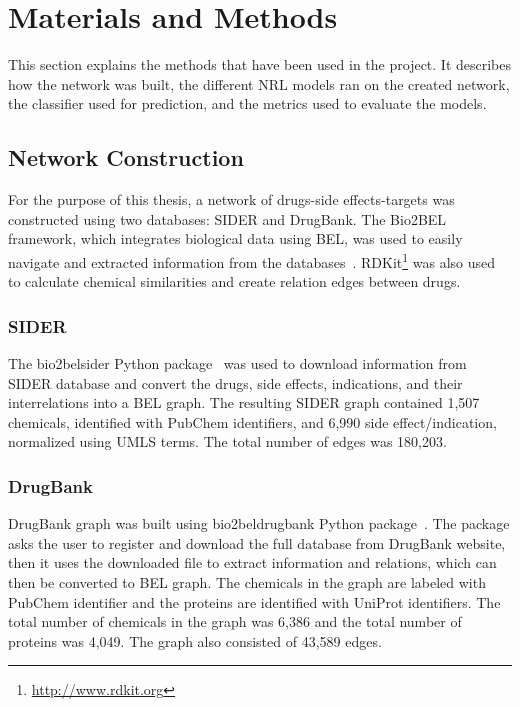 \chapter{Materials and Methods}
\label{methods}

This section explains the methods that have been used in the project.
It describes how the network was built, the different \ac{NRL} models ran on the created network, the classifier used for prediction, and the metrics used to evaluate the models.

\section{Network Construction}

For the purpose of this thesis, a network of drugs-side effects-targets was constructed using two databases: \ac{SIDER} and DrugBank.
The Bio2BEL framework, which integrates biological data using \ac{BEL}, was used to easily navigate and extracted information from the databases~\cite{hoyt_integration_2019}.
RDKit\footnote{\url{http://www.rdkit.org}} was also used to calculate chemical similarities and create relation edges between drugs.

\subsection{SIDER}
The bio2bel\textunderscore sider Python package~\cite{charles_tapley_hoyt_bio2bel/sider_2018} was used to download information from \ac{SIDER} database and convert the drugs, side effects, indications, and their interrelations into a \ac{BEL} graph.
The resulting \ac{SIDER} graph contained 1,507 chemicals, identified with PubChem identifiers, and 6,990 side effect/indication, normalized using \ac{UMLS} terms.
The total number of edges was 180,203.

\subsection{DrugBank}

DrugBank graph was built using bio2bel\textunderscore drugbank Python package~\cite{charles_tapley_hoyt_bio2bel/drugbank_2018}.
The package asks the user to register and download the full database from DrugBank website, then it uses the downloaded file to extract information and relations, which can then be converted to \ac{BEL} graph.
The chemicals in the graph are labeled with PubChem identifier and the proteins are identified with UniProt identifiers.
The total number of chemicals in the graph was 6,386 and the total number of proteins was 4,049.
The graph also consisted of 43,589 edges.

